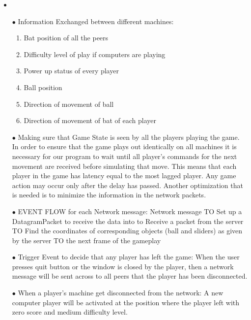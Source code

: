 \documentclass[10pt]{asme2ej}
\begin{document}
\begin{itemize}
\item \newline 
\item [$\bullet$] Information Exchanged between different machines:
\begin{enumerate}
\item Bat position of all the peers
\item Difficulty level of play if computers are playing

\item  	Power up status of every player
\item 	Ball position
\item 	Direction of movement of ball
\item 	Direction of movement of bat of each player

\end{enumerate}
\item [$\bullet$] Making sure that Game State is seen by all the players playing the game.\newline
In order to ensure that the game plays out identically on all machines it is necessary for our program to wait until all player’s commands for the next movement are received before simulating that move. This means that each player in the game has latency equal to the most lagged player. Any game action may occur only after the delay has passed. Another optimization that is needed is to minimize the information in the network packets.\newline
\item [$\bullet$] EVENT FLOW for each Network message: \newline
Network message  TO  Set up a DatagramPacket to receive the data into to Receive a packet from the server TO Find the coordinates of corresponding objects (ball and sliders) as given by the server TO  the next frame of the gameplay\newline

\item [$\bullet$] Trigger Event to decide that any player has left the game: \newline
When the user presses quit button or the window is closed by the player, then a network message will be sent across to all peers that the player has been disconnected.\newline
\item [$\bullet$] When a player's machine get disconnected from the network: \newline
A new computer player will be activated at the position where the player left with zero score and medium difficulty level.


\end{itemize}
\end{document}
